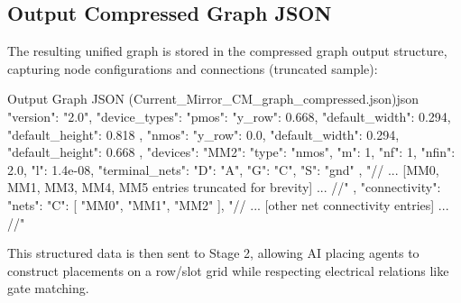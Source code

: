 \subsection{Output Compressed Graph JSON}
The resulting unified graph is stored in the compressed graph output structure, capturing node configurations and connections (truncated sample):

\begin{thesiscode}{Output Graph JSON (Current\_Mirror\_CM\_graph\_compressed.json)}{json}
{
    "version": "2.0",
    "device_types": {
        "pmos": {
            "y_row": 0.668,
            "default_width": 0.294,
            "default_height": 0.818
        },
        "nmos": {
            "y_row": 0.0,
            "default_width": 0.294,
            "default_height": 0.668
        }
    },
    "devices": {
        "MM2": {
            "type": "nmos",
            "m": 1,
            "nf": 1,
            "nfin": 2.0,
            "l": 1.4e-08,
            "terminal_nets": {
                "D": "A",
                "G": "C",
                "S": "gnd"
            }
        },
        "// ... [MM0, MM1, MM3, MM4, MM5 entries truncated for brevity] ... //"
    },
    "connectivity": {
        "nets": {
            "C": [
                "MM0",
                "MM1",
                "MM2"
            ],
            "// ... [other net connectivity entries] ... //"
        }
    }
}
\end{thesiscode}

This structured data is then sent to Stage 2, allowing AI placing agents to construct placements on a row/slot grid while respecting electrical relations like gate matching.
